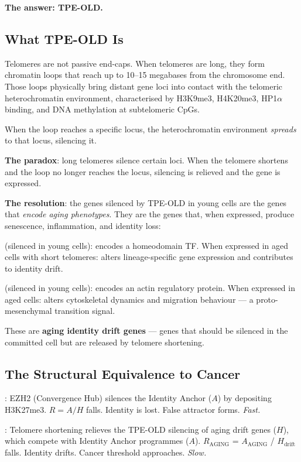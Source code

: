\documentclass[12pt,a4paper]{article}
\newcommand{\raging}{$R_{\mathrm{AGING}}$}
\newcommand{\tpeold}{TPE-OLD}
\begin{document}
\textbf{The answer: \tpeold{}.}

\subsection{What \tpeold{} Is}

Telomeres are not passive end-caps. When telomeres are long, they form
chromatin loops that reach up to 10--15 megabases from the chromosome end.
Those loops physically bring distant gene loci into contact with the
telomeric heterochromatin environment, characterised by H3K9me3, H4K20me3,
HP1$\alpha$ binding, and DNA methylation at subtelomeric CpGs.

When the loop reaches a specific locus, the heterochromatin environment
\textit{spreads} to that locus, silencing it.

\textbf{The paradox}: long telomeres silence certain loci. When the telomere
shortens and the loop no longer reaches the locus, silencing is relieved and
the gene is expressed.

\textbf{The resolution}: the genes silenced by \tpeold{} in young cells are
the genes that \textit{encode aging phenotypes}. They are the genes that, when
expressed, produce senescence, inflammation, and identity loss:

\begin{description}[leftmargin=2em]
  \item[\textbf{ISL2}] (silenced in young cells): encodes a homeodomain TF.
    When expressed in aged cells with short telomeres: alters lineage-specific
    gene expression and contributes to identity drift.
  \item[\textbf{VASP}] (silenced in young cells): encodes an actin regulatory
    protein. When expressed in aged cells: alters cytoskeletal dynamics and
    migration behaviour --- a proto-mesenchymal transition signal.
\end{description}

These are \textbf{aging identity drift genes} --- genes that should be silenced
in the committed cell but are released by telomere shortening.

\subsection{The Structural Equivalence to Cancer}

\begin{description}[leftmargin=2em]
  \item[\textbf{In cancer}]: EZH2 (Convergence Hub) silences the Identity
    Anchor ($A$) by depositing H3K27me3. $R = A/H$ falls. Identity is lost.
    False attractor forms. \textit{Fast.}

  \item[\textbf{In aging}]: Telomere shortening relieves the \tpeold{} silencing
    of aging drift genes ($H$), which compete with Identity Anchor programmes
    ($A$). \raging{} = $A_{\mathrm{AGING}}$ / $H_{\mathrm{drift}}$ falls.
    Identity drifts. Cancer threshold approaches. \textit{Slow.}
\end{description}
\end{document}

